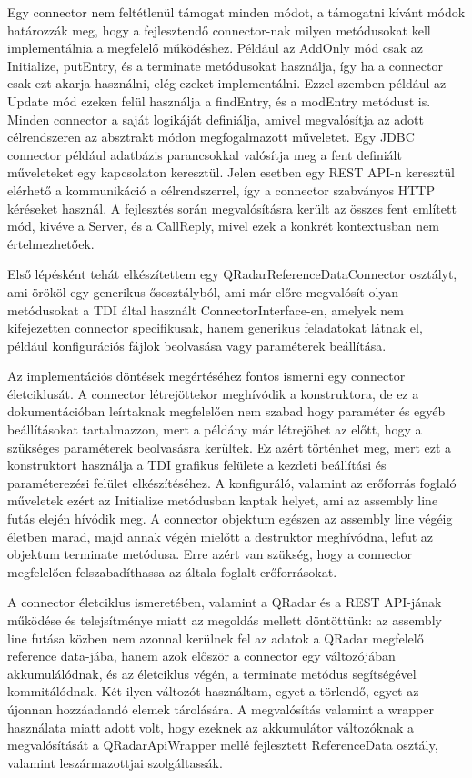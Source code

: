 Egy connector nem feltétlenül támogat minden módot, a támogatni kívánt módok határozzák meg, hogy a fejlesztendő connector-nak milyen metódusokat kell implementálnia a megfelelő működéshez. 
Például az AddOnly mód csak az Initialize, putEntry, és a terminate metódusokat használja, így ha a connector csak ezt akarja használni, elég ezeket implementálni. Ezzel szemben például az Update mód ezeken felül használja a findEntry, és a modEntry metódust is. Minden connector a saját logikáját definiálja, amivel megvalósítja az adott célrendszeren az absztrakt módon megfogalmazott műveletet. Egy JDBC connector például adatbázis parancsokkal valósítja meg a fent definiált műveleteket egy kapcsolaton keresztül. Jelen esetben egy REST API-n keresztül elérhető a kommunikáció a célrendszerrel, így a connector szabványos HTTP kéréseket használ. A fejlesztés során megvalósításra került az összes fent említett mód, kivéve a Server, és a CallReply, mivel ezek a konkrét kontextusban nem értelmezhetőek.

Első lépésként tehát elkészítettem egy QRadarReferenceDataConnector osztályt, ami örököl egy generikus ősosztályból, ami már előre megvalósít olyan metódusokat a TDI által használt ConnectorInterface-en, amelyek nem kifejezetten connector specifikusak, hanem generikus feladatokat látnak el, például konfigurációs fájlok beolvasása vagy paraméterek beállítása.

Az implementációs döntések megértéséhez fontos ismerni egy connector életciklusát. A connector létrejöttekor meghívódik a konstruktora, de ez a dokumentációban leírtaknak megfelelően nem szabad hogy paraméter és egyéb beállításokat tartalmazzon, mert a példány már létrejöhet az előtt, hogy a szükséges paraméterek beolvasásra kerültek. Ez azért történhet meg, mert ezt a konstruktort használja a TDI grafikus felülete a kezdeti beállítási és paraméterezési felület elkészítéséhez. A konfiguráló, valamint az erőforrás foglaló műveletek ezért az Initialize metódusban kaptak helyet, ami az assembly line futás elején hívódik meg. A connector objektum egészen az assembly line végéig életben marad, majd annak végén mielőtt a destruktor meghívódna, lefut az objektum terminate metódusa. Erre azért van szükség, hogy a connector megfelelően felszabadíthassa az általa foglalt erőforrásokat.

A connector életciklus ismeretében, valamint a QRadar és a REST API-jának működése és telejsítménye miatt az megoldás mellett döntöttünk: az assembly line futása közben nem azonnal kerülnek fel az adatok a QRadar megfelelő reference data-jába, hanem azok először a connector egy változójában akkumulálódnak, és az életciklus végén, a terminate metódus segítségével kommitálódnak. Két ilyen változót használtam, egyet a törlendő, egyet az újonnan hozzáadandó elemek tárolására. A megvalósítás valamint a wrapper használata miatt adott volt, hogy ezeknek az akkumulátor változóknak a megvalósítását a QRadarApiWrapper mellé fejlesztett ReferenceData osztály, valamint leszármazottjai szolgáltassák.

